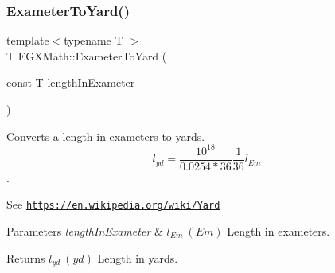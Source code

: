 \subsubsection{\texorpdfstring{Exameter\+To\+Yard()}{ExameterToYard()}}
{\footnotesize\ttfamily template$<$typename T $>$ \\
T E\+G\+X\+Math\+::\+Exameter\+To\+Yard (\begin{DoxyParamCaption}\item[{const T}]{length\+In\+Exameter }\end{DoxyParamCaption})}



Converts a length in exameters to yards. \[ l_{yd}= \frac{10^{18}}{0.0254 * 36} \frac{1}{36} l_{Em} \]. 

See \href{https://en.wikipedia.org/wiki/Yard}{\tt https\+://en.\+wikipedia.\+org/wiki/\+Yard} 
\begin{DoxyParams}{Parameters}
{\em length\+In\+Exameter} & $ l_{Em}\ (Em)$ Length in exameters. \\
\hline
\end{DoxyParams}
\begin{DoxyReturn}{Returns}
$ l_{yd}\ (yd)$ Length in yards. 
\end{DoxyReturn}
